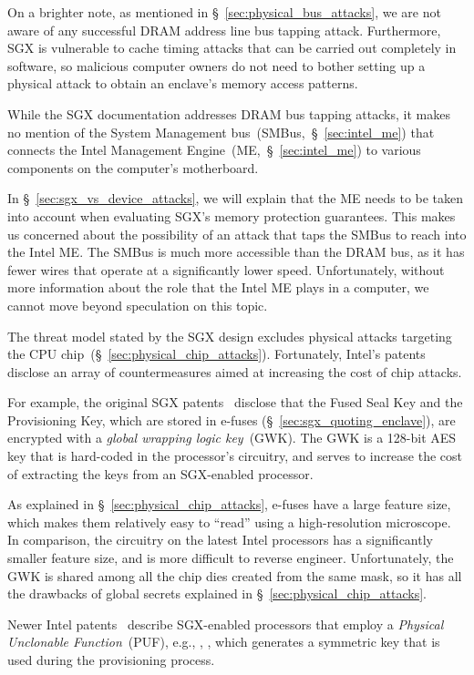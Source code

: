 On a brighter note, as mentioned in \S~\ref{sec:physical_bus_attacks}, we are
not aware of any successful DRAM address line bus tapping attack. Furthermore,
SGX is vulnerable to cache timing attacks that can be carried out completely in
software, so malicious computer owners do not need to bother setting up a
physical attack to obtain an enclave's memory access patterns.

While the SGX documentation addresses DRAM bus tapping attacks, it makes no
mention of the System Management bus~(SMBus,~\S~\ref{sec:intel_me}) that
connects the Intel Management Engine~(ME,~\S~\ref{sec:intel_me}) to various
components on the computer's motherboard.

In \S~\ref{sec:sgx_vs_device_attacks}, we will explain that the ME needs to be
taken into account when evaluating SGX's memory protection guarantees. This
makes us concerned about the possibility of an attack that taps the SMBus to
reach into the Intel ME. The SMBus is much more accessible than the DRAM bus,
as it has fewer wires that operate at a significantly lower speed.
Unfortunately, without more information about the role that the Intel ME plays
in a computer, we cannot move beyond speculation on this topic.

The threat model stated by the SGX design excludes physical attacks targeting
the CPU chip~(\S~\ref{sec:physical_chip_attacks}). Fortunately, Intel's patents
disclose an array of countermeasures aimed at increasing the cost of chip
attacks.

For example, the original SGX patents~\cite{intel2013patent1, intel2013patent2}
disclose that the Fused Seal Key and the Provisioning Key, which are stored in
e-fuses (\S~\ref{sec:sgx_quoting_enclave}), are encrypted with a \textit{global
wrapping logic key}~(GWK). The GWK is a 128-bit AES key that is hard-coded in
the processor's circuitry, and serves to increase the cost of extracting the
keys from an SGX-enabled processor.

As explained in \S~\ref{sec:physical_chip_attacks}, e-fuses have a large
feature size, which makes them relatively easy to ``read'' using a
high-resolution microscope. In comparison, the circuitry on the latest Intel
processors has a significantly smaller feature size, and is more difficult to
reverse engineer. Unfortunately, the GWK is shared among all the chip dies
created from the same mask, so it has all the drawbacks of global secrets
explained in \S~\ref{sec:physical_chip_attacks}.

Newer Intel patents~\cite{gotze2014provisioning, gotze2014provisioning2}
describe SGX-enabled processors that employ a \textit{Physical Unclonable
Function}~(PUF), e.g., \cite{suh2007puf}, \cite{maes2009puf}, which generates a
symmetric key that is used during the provisioning process.

